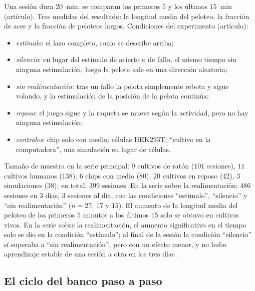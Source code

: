 Una sesión dura $20$~min; se comparan los primeros $5$ y los últimos $15$~min (artículo). Tres medidas del resultado: la longitud media del peloteo, la fracción de aces y la fracción de peloteos largos. Condiciones del experimento (artículo):
\begin{itemize}
\item \emph{estímulo}: el lazo completo, como se describe arriba;
\item \emph{silencio}: en lugar del estímulo de acierto o de fallo, el mismo tiempo sin ninguna estimulación; luego la pelota sale en una dirección aleatoria;
\item \emph{sin realimentación}: tras un fallo la pelota simplemente rebota y sigue volando, y la estimulación de la posición de la pelota continúa;
\item \emph{reposo}: el juego sigue y la raqueta se mueve según la actividad, pero no hay ninguna estimulación;
\item \emph{controles}: chip solo con medio; células HEK293T; “cultivo en la computadora”, una simulación en lugar de células.
\end{itemize}
Tamaño de muestra en la serie principal: $9$ cultivos de ratón ($101$ sesiones), $11$ cultivos humanos ($138$), $6$ chips con medio ($80$), $20$ cultivos en reposo ($42$), $3$ simulaciones ($38$); en total, $399$ sesiones. En la serie sobre la realimentación: $486$ sesiones en $3$ días, $3$ sesiones al día, con las condiciones “estímulo”, “silencio” y “sin realimentación” ($n=27$, $17$ y $15$). El aumento de la longitud media del peloteo de los primeros $5$ minutos a los últimos $15$ solo se obtuvo en cultivos vivos. En la serie sobre la realimentación, el aumento significativo en el tiempo solo se dio en la condición “estímulo”; al final de la sesión la condición “silencio” sí superaba a “sin realimentación”, pero con un efecto menor, y no hubo aprendizaje estable de una sesión a otra en los tres días~\cite{Kagan2022}.

\subsection*{El ciclo del banco paso a paso}

